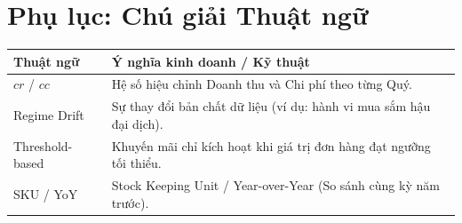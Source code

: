\documentclass{article}
\begin{document}
\appendix
\section{Phụ lục: Chú giải Thuật ngữ}

\begin{table}[H]
\centering
\footnotesize
\begin{tabular}{ll}
\toprule
\textbf{Thuật ngữ} & \textbf{Ý nghĩa kinh doanh / Kỹ thuật} \\
\midrule
$cr$ / $cc$ & Hệ số hiệu chỉnh Doanh thu và Chi phí theo từng Quý. \\
Regime Drift & Sự thay đổi bản chất dữ liệu (ví dụ: hành vi mua sắm hậu đại dịch). \\
Threshold-based & Khuyến mãi chỉ kích hoạt khi giá trị đơn hàng đạt ngưỡng tối thiểu. \\
SKU / YoY & Stock Keeping Unit / Year-over-Year (So sánh cùng kỳ năm trước). \\
\bottomrule
\end{tabular}
\end{table}
\end{document}
